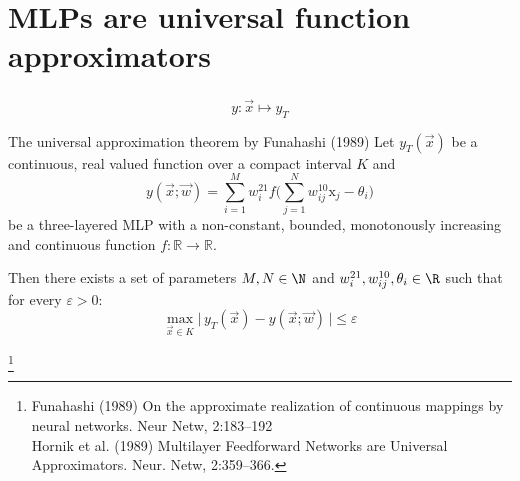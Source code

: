 \section{MLPs are universal function approximators}

\begin{frame}\frametitle{\secname}


\begin{equation}
y: \vec x \mapsto y_T
\end{equation}


   \begin{block}{The universal approximation theorem by Funahashi (1989)}
	\small
    	Let $y_T{(\vec{x})}$ be a continuous, real valued function 
    	over a compact interval $K$ and     
		\begin{equation} 
		{y}{(\vec{x}; \vec w)} = \sum_{i=1}^M {w}_i^{21} 
		f\Big( \sum\limits_{j=1}^N {w}_{ij}^{10} 
		  \mathrm{x}_j - \theta_i \Big)
		 \end{equation}
    	be a three-layered MLP with a non-constant, bounded, 
    	monotonously increasing and continuous function 
    	$f: \mathbb{R} \rightarrow \mathbb{R}$.\\
		\vspace{4mm}
	   \pause

		Then there exists a set of parameters 
		$M, N \in \N$ and ${w}_i^{21}, 
		{w}_{ij}^{10}, \theta_i \in \R$ 
		such that for every $\varepsilon > 0$:
		\begin{equation}
			\max_{\vec{x} \in K} \Big| \, y_T{(\vec{x})} - {y}{(\vec{x}; \vec w)} \,\Big| 
			\leq \varepsilon
		 \end{equation}

  \end{block}
   \footnote
	{
	 Funahashi (1989) On the approximate realization of 
		continuous mappings by neural networks. Neur Netw, 2:183--192\\
		Hornik et al. (1989) Multilayer Feedforward Networks 
		are Universal Approximators. Neur. Netw, 2:359--366.
		}
  
\end{frame}

